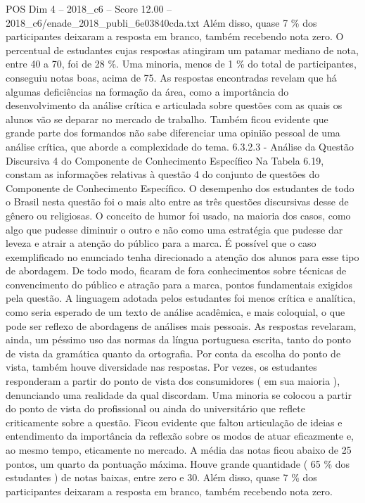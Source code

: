 \begin{textsample}{POS Dim 4 – 2018\_c6 – Score 12.00 – 2018\_c6/enade\_2018\_publi\_6e03840cda.txt}
Além disso, quase 7 \% dos participantes deixaram a resposta em branco, também recebendo nota zero.
O percentual de estudantes cujas respostas atingiram um patamar mediano de nota, entre 40 a 70, foi de 28 \%.
Uma minoria, menos de 1 \% do total de participantes, conseguiu notas boas, acima de 75.
As respostas encontradas revelam que há algumas deficiências na formação da área, como a importância do desenvolvimento da análise crítica e articulada sobre questões com as quais os alunos vão se deparar no mercado de trabalho.
Também ficou evidente que grande parte dos formandos não sabe diferenciar uma opinião pessoal de uma análise crítica, que aborde a complexidade do tema. 6.3.2.3 - Análise da Questão Discursiva 4 do Componente de Conhecimento Específico Na Tabela 6.19, constam as informações relativas à questão 4 do conjunto de questões do Componente de Conhecimento Específico.
O desempenho dos estudantes de todo o Brasil nesta questão foi o mais alto entre as três questões discursivas desse de gênero ou religiosas.
O conceito de humor foi usado, na maioria dos casos, como algo que pudesse diminuir o outro e não como uma estratégia que pudesse dar leveza e atrair a atenção do público para a marca.
É possível que o caso exemplificado no enunciado tenha direcionado a atenção dos alunos para esse tipo de abordagem.
De todo modo, ficaram de fora conhecimentos sobre técnicas de convencimento do público e atração para a marca, pontos fundamentais exigidos pela questão.
A linguagem adotada pelos estudantes foi menos crítica e analítica, como seria esperado de um texto de análise acadêmica, e mais coloquial, o que pode ser reflexo de abordagens de análises mais pessoais.
As respostas revelaram, ainda, um péssimo uso das normas da língua portuguesa escrita, tanto do ponto de vista da gramática quanto da ortografia.
Por conta da escolha do ponto de vista, também houve diversidade nas respostas.
Por vezes, os estudantes responderam a partir do ponto de vista dos consumidores ( em sua maioria ), denunciando uma realidade da qual discordam.
Uma minoria se colocou a partir do ponto de vista do profissional ou ainda do universitário que reflete criticamente sobre a questão.
Ficou evidente que faltou articulação de ideias e entendimento da importância da reflexão sobre os modos de atuar eficazmente e, ao mesmo tempo, eticamente no mercado.
A média das notas ficou abaixo de 25 pontos, um quarto da pontuação máxima.
Houve grande quantidade ( 65 \% dos estudantes ) de notas baixas, entre zero e 30.
Além disso, quase 7 \% dos participantes deixaram a resposta em branco, também recebendo nota zero.

\end{textsample}
